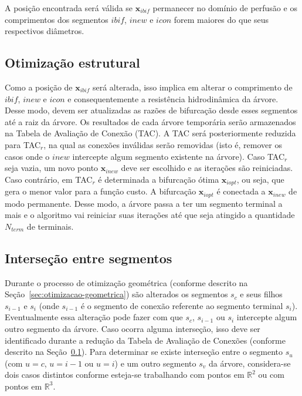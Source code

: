 A posição encontrada será válida se $\mathbf{x}_{ibif}$ permanecer no domínio de perfusão e 
os comprimentos dos segmentos $ibif$, $inew$ e $icon$ forem maiores do que seus respectivos 
diâmetros.

\subsection{Otimização estrutural}\label{sec:otimizacao-estrutural}

Como a posição de $\mathbf{x}_{ibif}$
será alterada, isso implica em alterar o comprimento de $ibif$, $inew$ e $icon$ e consequentemente
a resistência hidrodinâmica da árvore. Desse modo, devem ser atualizadas as razões de bifurcação 
desde esses segmentos até a raiz da árvore. Os resultados de cada árvore temporária serão armazenados 
na Tabela de Avaliação de Conexão (TAC). A TAC será posteriormente reduzida para TAC$_r$, na qual as 
conexões inválidas serão removidas (isto é, remover os casos onde o $inew$ intercepte algum segmento 
existente na árvore). Caso TAC$_r$ seja vazia, um novo ponto $\mathbf{x}_{inew}$ deve ser 
escolhido e as iterações são reiniciadas. Caso contrário, em TAC$_r$ é determinada a bifurcação 
ótima $\mathbf{x}_{iopt}$, ou seja, que gera o menor valor para a função custo. A bifurcação 
$\mathbf{x}_{iopt}$ é conectada a $\mathbf{x}_{inew}$ de modo permanente. Desse modo, a árvore 
passa a ter um segmento terminal a mais e o algoritmo vai reiniciar suas iterações até que seja 
atingido a quantidade $N_{term}$ de terminais.

\subsection{Interseção entre segmentos}\label{sec:intersecao-entre-segmentos}

Durante o processo de otimização geométrica (conforme descrito na Seção~\ref{sec:otimizacao-geometrica}) são 
alterados os segmentos $s_c$ e seus filhos $s_{i-1}$ e $s_{i}$ (onde $s_{i-1}$ é o segmento de conexão referente 
ao segmento terminal $s_i$). Eventualmente essa alteração pode fazer com que $s_c$, $s_{i-1}$ ou $s_i$ 
intercepte algum outro segmento da árvore. Caso ocorra alguma interseção, isso deve ser identificado 
durante a redução da Tabela de Avaliação de Conexões (conforme descrito na Seção~\ref{sec:otimizacao-estrutural}).
Para determinar se existe interseção entre o segmento $s_u$ (com $u=c$, $u=i-1$ ou $u=i$) e um outro segmento 
$s_v$ da árvore, considera-se dois casos distintos conforme esteja-se trabalhando com pontos em $\mathbb{R}^2$ ou 
com pontos em $\mathbb{R}^3$.

